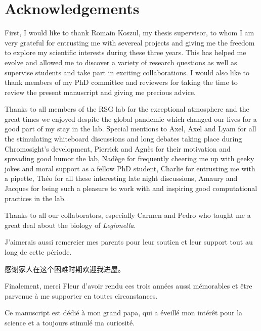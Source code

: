 %
\chapter*{Acknowledgements}
\label{sec:acknowledgements}
\vspace*{-10mm}

First, I would like to thank Romain Koszul, my thesis supervisor, to whom I am very grateful for entrusting me with severeal projects and giving me the freedom to explore my scientific interests during these three years. This has helped me evolve and allowed me to discover a variety of research questions as well as supervise students and take part in exciting collaborations. I would also like to thank members of my PhD committee and reviewers for taking the time to review the present manuscript and giving me precious advice.

Thanks to all members of the RSG lab for the exceptional atmosphere and the great times we enjoyed despite the global pandemic which changed our lives for a good part of my stay in the lab. Special mentions to Axel, Axel and Lyam for all the stimulating whiteboard discussions and long debates taking place during Chromosight's development, Pierrick and Agnès for their motivation and spreading good humor the lab, Nadège for frequently cheering me up with geeky jokes and moral support as a fellow PhD student, Charlie for entrusting me with a pipette, Théo for all these interesting late night discussions, Amaury and Jacques for being such a pleasure to work with and inspiring good computational practices in the lab.

Thanks to all our collaborators, especially Carmen and Pedro who taught me a great deal about the biology of \textit{Legionella}.

J'aimerais aussi remercier mes parents pour leur soutien et leur support tout au long de cette période.
\begin{CJK*}{UTF8}{gbsn}
感谢家人在这个困难时期欢迎我进屋。
\end{CJK*}
Finalement, merci Fleur d'avoir rendu ces trois années aussi mémorables et être parvenue à me supporter en toutes circonstances.

Ce manuscript est dédié à mon grand papa, qui a éveillé mon intérêt pour la science et a toujours stimulé ma curiosité.
